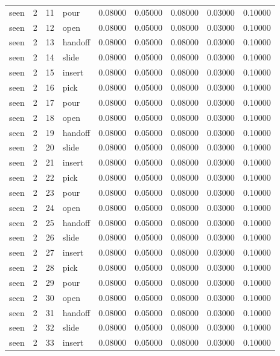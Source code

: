 \documentclass{article}
\begin{document}
\begin{center}
\begin{longtable}{lllllllll}
seen & 2 & 11 & pour & 0.08000 & 0.05000 & 0.08000 & 0.03000 & 0.10000 \\
seen & 2 & 12 & open & 0.08000 & 0.05000 & 0.08000 & 0.03000 & 0.10000 \\
seen & 2 & 13 & handoff & 0.08000 & 0.05000 & 0.08000 & 0.03000 & 0.10000 \\
seen & 2 & 14 & slide & 0.08000 & 0.05000 & 0.08000 & 0.03000 & 0.10000 \\
seen & 2 & 15 & insert & 0.08000 & 0.05000 & 0.08000 & 0.03000 & 0.10000 \\
seen & 2 & 16 & pick & 0.08000 & 0.05000 & 0.08000 & 0.03000 & 0.10000 \\
seen & 2 & 17 & pour & 0.08000 & 0.05000 & 0.08000 & 0.03000 & 0.10000 \\
seen & 2 & 18 & open & 0.08000 & 0.05000 & 0.08000 & 0.03000 & 0.10000 \\
seen & 2 & 19 & handoff & 0.08000 & 0.05000 & 0.08000 & 0.03000 & 0.10000 \\
seen & 2 & 20 & slide & 0.08000 & 0.05000 & 0.08000 & 0.03000 & 0.10000 \\
seen & 2 & 21 & insert & 0.08000 & 0.05000 & 0.08000 & 0.03000 & 0.10000 \\
seen & 2 & 22 & pick & 0.08000 & 0.05000 & 0.08000 & 0.03000 & 0.10000 \\
seen & 2 & 23 & pour & 0.08000 & 0.05000 & 0.08000 & 0.03000 & 0.10000 \\
seen & 2 & 24 & open & 0.08000 & 0.05000 & 0.08000 & 0.03000 & 0.10000 \\
seen & 2 & 25 & handoff & 0.08000 & 0.05000 & 0.08000 & 0.03000 & 0.10000 \\
seen & 2 & 26 & slide & 0.08000 & 0.05000 & 0.08000 & 0.03000 & 0.10000 \\
seen & 2 & 27 & insert & 0.08000 & 0.05000 & 0.08000 & 0.03000 & 0.10000 \\
seen & 2 & 28 & pick & 0.08000 & 0.05000 & 0.08000 & 0.03000 & 0.10000 \\
seen & 2 & 29 & pour & 0.08000 & 0.05000 & 0.08000 & 0.03000 & 0.10000 \\
seen & 2 & 30 & open & 0.08000 & 0.05000 & 0.08000 & 0.03000 & 0.10000 \\
seen & 2 & 31 & handoff & 0.08000 & 0.05000 & 0.08000 & 0.03000 & 0.10000 \\
seen & 2 & 32 & slide & 0.08000 & 0.05000 & 0.08000 & 0.03000 & 0.10000 \\
seen & 2 & 33 & insert & 0.08000 & 0.05000 & 0.08000 & 0.03000 & 0.10000 \\

\end{longtable}
\end{center}
\end{document}
